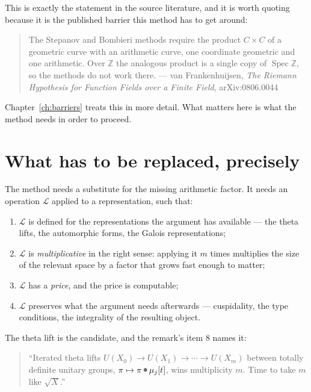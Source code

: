 This is exactly the statement in the source literature, and it is worth
quoting because it is the published barrier this method has to get around:

\begin{quote}
\small
The Stepanov and Bombieri methods require the product $C \times C$ of a
geometric curve with an arithmetic curve, one coordinate geometric and one
arithmetic. Over $\mathbb{Z}$ the analogous product is a single copy of
$\operatorname{Spec}\mathbb{Z}$, so the methods do not work there.
\hfill --- van Frankenhuijsen, \emph{The Riemann Hypothesis for Function Fields
over a Finite Field}, arXiv:0806.0044
\end{quote}

Chapter~\ref{ch:barriers} treats this in more detail. What matters here is
what the method needs in order to proceed.

\section{What has to be replaced, precisely}The method needs a substitute for the missing arithmetic factor. It needs an
operation $\mathcal{L}$ applied to a representation, such that:

\begin{enumerate}
\item $\mathcal{L}$ is defined for the representations the argument has
available --- the theta lifts, the automorphic forms, the Galois
representations;
\item $\mathcal{L}$ is \emph{multiplicative} in the right sense: applying it
$m$ times multiplies the size of the relevant space by a factor that grows
fast enough to matter;
\item $\mathcal{L}$ has a \emph{price}, and the price is computable;
\item $\mathcal{L}$ preserves what the argument needs afterwards --- cuspidality,
the type conditions, the integrality of the resulting object.
\end{enumerate}

The theta lift is the candidate, and the remark's item 8 names it:

\begin{quote}
\small
``Iterated theta lifts $U(X_0) \to U(X_1) \to \cdots \to U(X_m)$ between totally
definite unitary groups, $\pi \mapsto \pi \tboxplus \mu_j\lbrack t\rbrack$, wins
multiplicity $m$. Time to take $m$ like $\sqrt X$.''
\end{quote}

